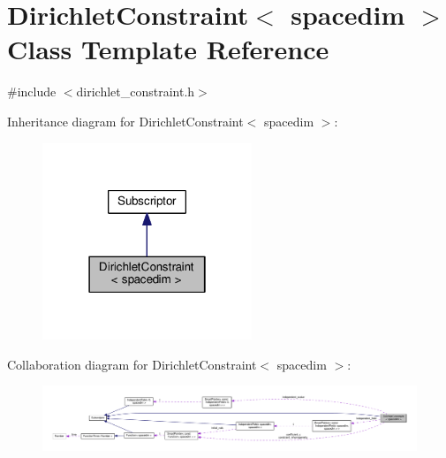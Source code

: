 \hypertarget{class_dirichlet_constraint}{}\section{Dirichlet\+Constraint$<$ spacedim $>$ Class Template Reference}
\label{class_dirichlet_constraint}


{\ttfamily \#include $<$dirichlet\+\_\+constraint.\+h$>$}



Inheritance diagram for Dirichlet\+Constraint$<$ spacedim $>$\+:\nopagebreak
\begin{figure}[H]
\begin{center}
\leavevmode
\includegraphics[width=178pt]{class_dirichlet_constraint__inherit__graph}
\end{center}
\end{figure}


Collaboration diagram for Dirichlet\+Constraint$<$ spacedim $>$\+:\nopagebreak
\begin{figure}[H]
\begin{center}
\leavevmode
\includegraphics[width=350pt]{class_dirichlet_constraint__coll__graph}
\end{center}
\end{figure}

